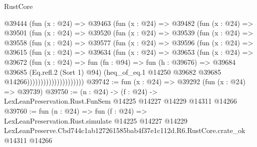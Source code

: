 \begin{lexlean}{RustCore}
\begin{coremodule}
                @39444
                  (fun (x : @24) =>
                  @39463
                    (fun (x : @24) =>
                    @39482
                      (fun (x : @24) =>
                      @39501
                        (fun (x : @24) =>
                        @39520
                          (fun (x : @24) =>
                          @39539
                            (fun (x : @24) =>
                            @39558
                              (fun (x : @24) =>
                              @39577
                                (fun (x : @24) =>
                                @39596
                                  (fun (x : @24) =>
                                  @39615
                                    (fun (x : @24) =>
                                    @39634
                                      (fun (x : @24) =>
                                      @39653
                                        (fun (x : @24) =>
                                        @39672
                                          (fun (x : @24) =>
                                          fun (fn : @94) =>
                                          fun (h : @39676) =>
                                          @39684
                                            @39685
                                            (Eq.refl.{2} (Sort 1) @94)
                                            (heq_of_eq.{1}
                                              @14250
                                              @39682
                                              @39685
                                              @14266)))))))))))))))))))))
@39742 := fun (x : @24) => @39292 (fun (x : @24) => @39739)
@39750 := (n : @24) ->
  (f : @24) -> LexLeanPreservation.Rust.FunSem @14225 @14227 @14229 @14311 @14266
@39760 := fun (n : @24) =>
  fun (f : @24) =>
  LexLeanPreservation.Rust.simulate
    @14225
    @14227
    @14229
    LexLeanPreserve.Cbd744c1ab127261585bab4f37e1c112d.R6.RustCore.crate_ok
    @14311
    @14266
\end{coremodule}
\end{lexlean}
